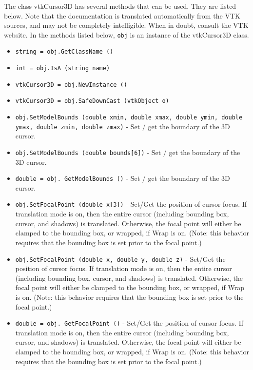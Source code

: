 The class vtkCursor3D has several methods that can be used.
  They are listed below.
Note that the documentation is translated automatically from the VTK sources,
and may not be completely intelligible.  When in doubt, consult the VTK website.
In the methods listed below, \verb|obj| is an instance of the vtkCursor3D class.
\begin{itemize}
\item  \verb|string = obj.GetClassName ()|

\item  \verb|int = obj.IsA (string name)|

\item  \verb|vtkCursor3D = obj.NewInstance ()|

\item  \verb|vtkCursor3D = obj.SafeDownCast (vtkObject o)|

\item  \verb|obj.SetModelBounds (double xmin, double xmax, double ymin, double ymax, double zmin, double zmax)| -  Set / get the boundary of the 3D cursor.

\item  \verb|obj.SetModelBounds (double bounds[6])| -  Set / get the boundary of the 3D cursor.

\item  \verb|double = obj. GetModelBounds ()| -  Set / get the boundary of the 3D cursor.

\item  \verb|obj.SetFocalPoint (double x[3])| -  Set/Get the position of cursor focus. If translation mode is on,
 then the entire cursor (including bounding box, cursor, and shadows)
 is translated. Otherwise, the focal point will either be clamped to the
 bounding box, or wrapped, if Wrap is on. (Note: this behavior requires
 that the bounding box is set prior to the focal point.)

\item  \verb|obj.SetFocalPoint (double x, double y, double z)| -  Set/Get the position of cursor focus. If translation mode is on,
 then the entire cursor (including bounding box, cursor, and shadows)
 is translated. Otherwise, the focal point will either be clamped to the
 bounding box, or wrapped, if Wrap is on. (Note: this behavior requires
 that the bounding box is set prior to the focal point.)

\item  \verb|double = obj. GetFocalPoint ()| -  Set/Get the position of cursor focus. If translation mode is on,
 then the entire cursor (including bounding box, cursor, and shadows)
 is translated. Otherwise, the focal point will either be clamped to the
 bounding box, or wrapped, if Wrap is on. (Note: this behavior requires
 that the bounding box is set prior to the focal point.)


\end{itemize}
